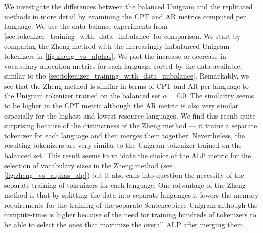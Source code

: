 We investigate the differences between the balanced Unigram and the replicated methods in more detail by examining the CPT and AR metrics computed per language. We use the data balance experiments from \autoref{sec:tokenizer_training_with_data_imbalance} for comparison. We start by comparing the Zheng method with the increasingly imbalanced Unigram tokenizers in \autoref{fig:zheng_vs_alphas}. We plot the increase or decrease in vocabulary allocation metrics for each language sorted by the data available, similar to the \autoref{sec:tokenizer_training_with_data_imbalance}. Remarkably, we see that the Zheng method is similar in terms of CPT and AR per language to the Unigram tokenizer trained on the balanced set $\alpha=0.0$. The similarity seems to be higher in the CPT metric although the AR metric is also very similar especially for the highest and lowest resource languages. We find this result quite surprising because of the distinctness of the Zheng method --- it trains a separate tokenizer for each language and then merges them together. Nevertheless, the resulting tokenizers are very similar to the Unigram tokenizer trained on the balanced set. This result seems to validate the choice of the ALP metric for the selection of vocabulary sizes in the Zheng method (see \autoref{fig:zheng_vs_alphas_alp}) but it also calls into question the necessity of the separate training of tokenizers for each language. One advantage of the Zheng method is that by splitting the data into separate languages it lowers the memory requirements for the training of the separate Sentencepiece Unigram although the compute-time is higher because of the need for training hundreds of tokenizers to be able to select the ones that maximize the overall ALP after merging them.

